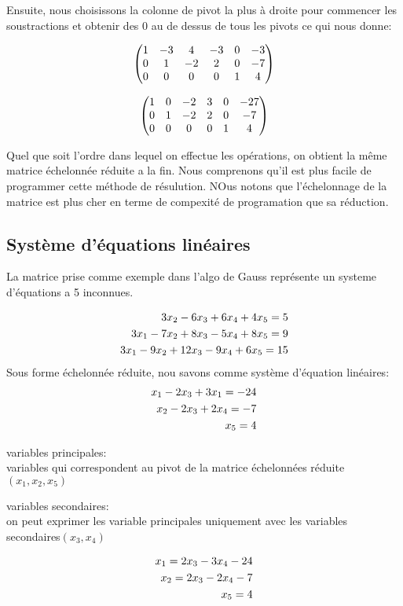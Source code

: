 \documentclass[a4paper,10pt]{article}
\begin{document}
 Ensuite, nous choisissons la colonne de pivot la plus à droite pour commencer les soustractions et obtenir des 0 au de dessus de tous les pivots ce qui nous donne:
 
  \[
\begin{pmatrix}%
 1&-3&4&-3&0&-3\cr
 0&1&-2&2&0&-7\cr
 0&0&0&0&1&4
 \end{pmatrix}
\]
 
   \[
\begin{pmatrix}%
 1&0&-2&3&0&-27\cr
 0&1&-2&2&0&-7\cr
 0&0&0&0&1&4
 \end{pmatrix}
\]
 

 Quel que soit l'ordre dans lequel on effectue les opérations, on obtient la même matrice échelonnée réduite a la fin.
 Nous comprenons qu'il est plus facile de programmer cette méthode de résulution. NOus notons que l'échelonnage de la matrice est plus cher en terme de compexité de programation que sa réduction.
 
 \subsection{Système d'équations linéaires}
 
 La matrice prise comme exemple dans l'algo de Gauss représente un systeme d'équations a 5 inconnues.
 
 \begin{eqnarray}
  3x_2-6x_3+6x_4+4x_5=5\cr
  3x_1-7x_2+8x_3-5x_4+8x_5=9\cr
  3x_1-9x_2+12x_3-9x_4+6x_5=15
 \end{eqnarray}
Sous forme échelonnée réduite, nou savons comme système d'équation linéaires:
\begin{eqnarray}
x_1-2x_3+3x_1=-24\cr
x_2-2x_3+2x_4=-7\cr
x_5=4
\end{eqnarray}
 
 \begin{description}
  \item variables principales:\\{variables qui correspondent au pivot de la matrice échelonnées réduite$(x_1,x_2,x_5)$}
  \item variables secondaires:\\{on peut exprimer les variable principales uniquement avec les variables secondaires$(x_3,x_4)$}
 \end{description}

 \begin{eqnarray}
x_1=2x_3-3x_4-24\cr
x_2=2x_3-2x_4-7\cr
x_5=4
\end{eqnarray}
\end{document}
